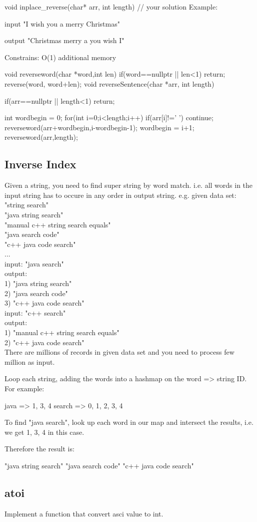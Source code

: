 void inplace_reverse(char* arr, int length) {
	// your solution
}
Example: 

input "I wish you a merry Christmas" 

output "Christmas merry a you wish I" 

Constrains: O(1) additional memory

\begin{Code}
	void reverseword(char *word,int len){
		if(word==nullptr || len<1) return;
		reverse(word, word+len);
	}
	void reverseSentence(char *arr, int length){
		if(arr==nullptr || length<1) return;
		
		int wordbegin = 0;
		for(int i=0;i<length;i++){
			if(arr[i]!=' ') continue;
			reverseword(arr+wordbegin,i-wordbegin-1);
			wordbegin = i+1;
		}
		reverseword(arr,length);
	}
\end{Code}

\subsection{Inverse Index}
Given a string, you need to find super string by word match. i.e. all words in the input string has to occure in any order in output string. 
e.g. given data set: \\
"string search" \\
"java string search" \\
"manual c++ string search equals" \\
"java search code" \\
"c++ java code search" \\
... \\

input: "java search" \\
output: \\
1) "java string search" \\
2) "java search code" \\
3) "c++ java code search" \\

input: "c++ search" \\
output: \\
1) "manual c++ string search equals" \\
2) "c++ java code search" \\

There are millions of records in given data set and you need to process few million as input.

\begin{Code}
	Loop each string, adding the words into a hashmap on the word => string ID. For example: 
	
	java => 1, 3, 4 
	search => 0, 1, 2, 3, 4 
	
	To find "java search", look up each word in our map and intersect the results, i.e. we get 1, 3, 4 in this case. 
	
	Therefore the result is: 
	
	"java string search" 
	"java search code" 
	"c++ java code search" 
\end{Code}

\subsection{atoi}
Implement a function that convert asci value to int.